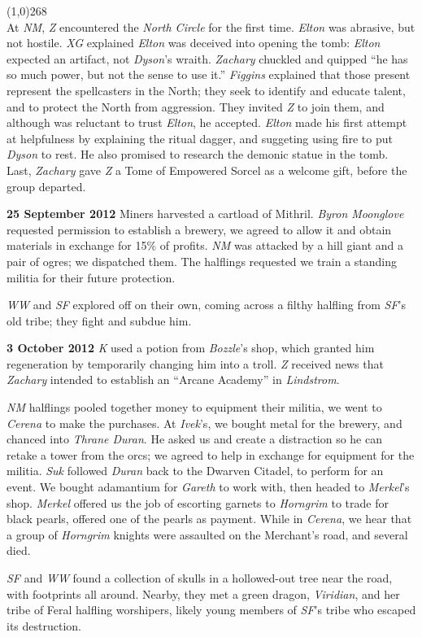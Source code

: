 \documentclass[letterpaper]{article}
\newcommand{\colline}{\noindent\line(1,0){268} \\}
\newcommand{\e}[1]{\emph{#1}}
\newcommand{\B}[1]{\textbf{#1}}
\newenvironment{notesection}[1]
{\noindent {\huge \B{#1}} \par
\vspace{-0.75em}
\colline
\begingroup\fontsize{9pt}{12pt}\selectfont}
{\endgroup}
\begin{document}
\begin{notesection}{Events}
At \e{NM}, \e{Z} encountered the \e{North Circle} for the first time. \e{Elton} was abrasive, but not hostile. \e{XG} explained \e{Elton} was deceived into opening the tomb: \emph{Elton} expected an artifact, not \e{Dyson}'s wraith.  \e{Zachary} chuckled and quipped ``he has so much power, but not the sense to use it.'' \e{Figgins} explained that those present represent the spellcasters in the North; they seek to identify and educate talent, and to protect the North from aggression. They invited \e{Z} to join them, and although was reluctant to trust \e{Elton}, he accepted. \e{Elton} made his first attempt at helpfulness by explaining the ritual dagger, and suggeting using fire to put \e{Dyson} to rest. He also promised to research the demonic statue in the tomb.  Last, \e{Zachary} gave \e{Z} a Tome of Empowered Sorcel as a welcome gift, before the group departed.

\B{25 September 2012} Miners harvested a cartload of Mithril. \e{Byron Moonglove} requested permission to establish a brewery, we agreed to allow it and obtain materials in exchange for 15\% of profits. \e{NM} was attacked by a hill giant and a pair of ogres; we dispatched them. The halflings requested we train a standing militia for their future protection.

\e{WW} and \e{SF} explored off on their own, coming across a filthy halfling from \e{SF}'s old tribe; they fight and subdue him.

\B{3 October 2012} \e{K} used a potion from \e{Bozzle}'s shop, which granted him regeneration by temporarily changing him into a troll. \e{Z} received news that \e{Zachary} intended to establish an ``Arcane Academy'' in \e{Lindstrom}.

\e{NM} halflings pooled together money to equipment their militia, we went to \e{Cerena} to make the purchases. At \e{Ivek}'s, we bought metal for the brewery, and chanced into \e{Thrane Duran}. He asked us and create a distraction so he can retake a tower from the orcs; we agreed to help in exchange for equipment for the militia. \e{Suk} followed \e{Duran} back to the Dwarven Citadel, to perform for an event. We bought adamantium for \e{Gareth} to work with, then headed to \e{Merkel}'s shop. \e{Merkel} offered us the job of escorting garnets to \e{Horngrim} to trade for black pearls, offered one of the pearls as payment. While in \e{Cerena}, we hear that a group of \e{Horngrim} knights were assaulted on the Merchant's road, and several died.

\e{SF} and \e{WW} found a collection of skulls in a hollowed-out tree near the road, with footprints all around. Nearby, they met a green dragon, \e{Viridian}, and her tribe of Feral halfling worshipers, likely young members of \e{SF}'s tribe who escaped its destruction.


\end{notesection}
\end{document}
